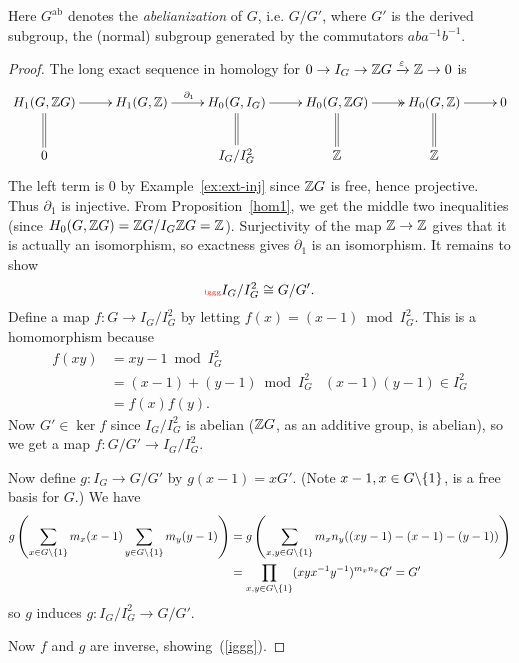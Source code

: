 Here $G^{\text{ab}}$ denotes the {\it abelianization} of $G$, i.e. $G/G'$, where $G'$ is the derived subgroup, the (normal) subgroup generated by the commutators $aba^{-1}b^{-1}$.
\begin{proof}
The long exact sequence in homology for $0\to I_G\to \mathbb{Z} G\xrightarrow{\varepsilon} \mathbb{Z}\to 0$ is
\[
\xymatrix{
H_1(G,\Z G)\ar[r] \ar@{=}[d]&H_1(G,\Z)\ar[r]^{\partial_1} & H_0(G,I_G)\ar[r]\ar@{=}[d] & H_0(G,\Z G) \ar@{->>}[r] \ar@{=}[d]& H_0(G,\Z)\ar[r] \ar@{=}[d]& 0\\
0 & & I_G/I_G^2 & \Z & \Z}
\]
The left term is 0 by Example~\ref{ex:ext-inj} since $\mathbb{Z} G$ is free, hence projective. Thus $\partial_1$ is injective. From Proposition~\ref{hom1}, we get the middle two inequalities (since $H_0(G,\mathbb{Z} G)=\mathbb{Z} G/I_G\mathbb{Z} G=\mathbb{Z}$). Surjectivity of the map $\mathbb{Z}\to \mathbb{Z}$ gives that it is actually an isomorphism, so exactness gives $\partial_1$ is an isomorphism. It remains to show
\begin{equation}\llabel{iggg}
I_G/I_G^2 \cong G/G'.
\end{equation}
Define a map $f:G\to I_G/I_G^2$ by letting $f(x)=(x-1)\bmod I_G^2$. This is a homomorphism because
\begin{align*}
f(xy)&=xy-1\bmod{I_G^2}\\
&=(x-1)+(y-1)\bmod{I_G^2}&(x-1)(y-1)\in I_G^2\\
&=f(x)f(y).
\end{align*}
Now $G'\in \ker f$ since $I_G/I_G^2$ is abelian ($\mathbb{Z} G$, as an additive group, is abelian), so we get a map $f:G/G'\to I_G/I_G^2$.

Now define $g:I_G\to G/G'$ by $g(x-1)=xG'$. (Note $x-1,x\in G\backslash\{1\}$, is a free basis for $G$.) We have
\begin{align*}
g\left( {\sum_{x\in G\backslash\{1\}}m_x(x-1)\sum_{y\in G\backslash\{1\}}m_y(y-1)} \right)
&=g\left( {\sum_{x,y\in G\backslash\{1\}} m_xn_y((xy-1)-(x-1)-(y-1))} \right)\\
&=\prod_{x,y\in G\backslash\{1\}} (xyx^{-1}y^{-1})^{m_xn_x}G'=G'
\end{align*}
so $g$ induces $g:I_G/I_G^2\to G/G'$.

Now $f$ and $g$ are inverse, showing~(\ref{iggg}).
\end{proof}

